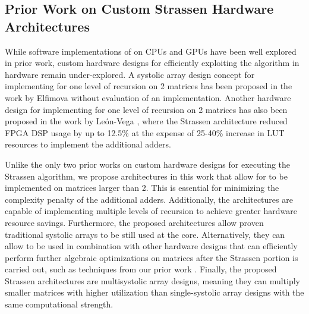 \subsection{Prior Work on Custom Strassen Hardware Architectures}
\label{background:sec:smm}
While software implementations of \sa on CPUs and GPUs have been well explored in prior work, custom hardware designs for efficiently exploiting the algorithm in hardware remain under-explored.
A systolic array design concept for implementing \sa for one level of recursion on 2 matrices has been proposed in the work by Elfimova \ea \cite{elfimova2001fast} without evaluation of an implementation.
Another hardware design for implementing \sa for one level of recursion on 2 matrices has also been proposed in the work by León-Vega \ea \cite{leon2023accel}, where the Strassen architecture reduced FPGA DSP usage by up to 12.5\% at the expense of 25-40\% increase in LUT resources to implement the additional adders.

Unlike the only two prior works on custom hardware designs for executing the Strassen algorithm, we propose architectures in this work that allow for \sa to be implemented on matrices larger than 2.
This is essential for minimizing the complexity penalty of the additional adders.
Additionally, the architectures are capable of implementing multiple levels of \s recursion to achieve greater hardware resource savings.
Furthermore, the proposed architectures allow proven traditional systolic arrays to be still used at the core.
Alternatively, they can allow \sa to be used in combination with other hardware designs that can efficiently perform further algebraic optimizations on matrices after the Strassen portion is carried out, such as techniques from our prior work \cite{pogue2024fast}.
Finally, the proposed Strassen architectures are multisystolic array designs, meaning they can multiply smaller matrices with higher utilization than single-systolic array designs with the same computational strength.

